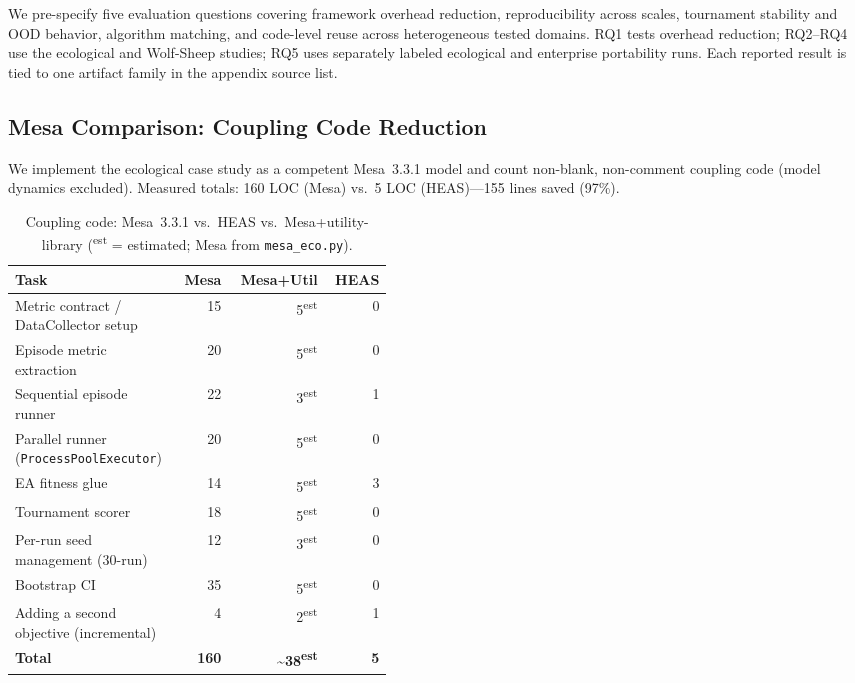 \documentclass{wscpaperproc}
\begin{document}
We pre-specify five evaluation questions covering framework overhead reduction,
reproducibility across scales, tournament stability and OOD behavior,
algorithm matching, and code-level reuse across heterogeneous tested domains.
RQ1 tests overhead reduction; RQ2--RQ4 use the ecological and Wolf-Sheep
studies; RQ5 uses separately labeled ecological and enterprise portability
runs. Each reported result is tied to one artifact family in the appendix
source list.

\subsection{Mesa Comparison: Coupling Code Reduction}
\label{sec:mesa-comparison}

We implement the ecological case study as a competent Mesa~3.3.1 model and
count non-blank, non-comment coupling code (model dynamics excluded).
Measured totals: 160 LOC (Mesa) vs.\ 5 LOC (HEAS)---155 lines saved (97\%).

\begin{table}[ht]
\caption{Coupling code: Mesa~3.3.1 vs.\ HEAS vs.\ Mesa+utility-library
  (\textsuperscript{est} = estimated; Mesa from \texttt{mesa\_eco.py}).}
\label{tab:loc}
\centering\small
\begin{tabular}{p{0.44\linewidth}rrr}
\toprule
Task & Mesa & Mesa+Util & HEAS \\
\midrule
Metric contract / DataCollector setup   & 15 & 5\textsuperscript{est} & 0 \\
Episode metric extraction               & 20 & 5\textsuperscript{est} & 0 \\
Sequential episode runner               & 22 & 3\textsuperscript{est} & 1 \\
Parallel runner (\texttt{ProcessPoolExecutor}) & 20 & 5\textsuperscript{est} & 0 \\
EA fitness glue                         & 14 & 5\textsuperscript{est} & 3 \\
Tournament scorer                       & 18 & 5\textsuperscript{est} & 0 \\
Per-run seed management (30-run)        & 12 & 3\textsuperscript{est} & 0 \\
Bootstrap CI                            & 35 & 5\textsuperscript{est} & 0 \\
Adding a second objective (incremental) & 4  & 2\textsuperscript{est} & 1 \\
\midrule
\textbf{Total}                          & \textbf{160} & \textbf{\textasciitilde38\textsuperscript{est}} & \textbf{5} \\
\bottomrule
\end{tabular}
\end{table}
\end{document}
